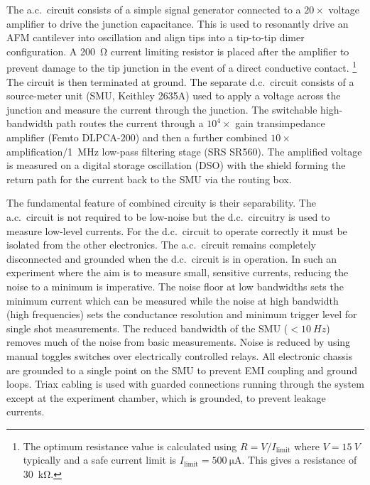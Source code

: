 \documentclass{article}
\begin{document}
The a.c.\ circuit consists of a simple signal generator connected to a $20\times$ voltage amplifier to drive the junction capacitance. This is used to resonantly drive an AFM cantilever into oscillation and align tips into a tip-to-tip dimer configuration. A \SI{200}{\ohm} current limiting resistor is placed after the amplifier to prevent damage to the tip junction in the event of a direct conductive contact.%
\footnote{The optimum resistance value is calculated using $R = V/I_{\mathrm{limit}}$ where $V=\SI{15}{V}$ typically and a safe current limit is $I_{\mathrm{limit}}=\SI{500}{\micro\ampere}$. This gives a resistance of \SI{30}{\kilo\ohm}.}
The circuit is then terminated at ground.
The separate d.c.\ circuit consists of a source-meter unit (SMU, Keithley 2635A) used to apply a voltage across the junction and measure the current through the junction. The switchable high-bandwidth path routes the current through a $10^4\times$ gain transimpedance amplifier (Femto DLPCA-200) and then a further combined $10\times$ amplification/\SI{1}{MHz} low-pass filtering stage (SRS SR560). The amplified voltage is measured on a digital storage oscillation (DSO) with the shield forming the return path for the current back to the SMU via the routing box.

The fundamental feature of combined circuity is their separability. The a.c.\ circuit is not required to be low-noise but the d.c.\ circuitry is used to measure low-level currents. For the d.c.\ circuit to operate correctly it must be isolated from the other electronics. The a.c.\ circuit remains completely disconnected {\color{red} and grounded} when the d.c.\ circuit is in operation.
In such an experiment where the aim is to measure small, sensitive currents, reducing the noise to a minimum is imperative. The noise floor at low bandwidths sets the minimum current which can be measured while the noise at high bandwidth (high frequencies) sets the conductance resolution and minimum trigger level for single shot measurements.
The reduced bandwidth of the SMU ($<\SI{10}{Hz}$) removes much of the noise from {\color{red}basic} measurements. Noise is reduced by using manual toggles switches over electrically controlled relays. All electronic chassis are grounded to a single point on the SMU to prevent EMI coupling and ground loops. Triax cabling is used with guarded connections running through the system except at the experiment chamber, which is grounded, to prevent leakage currents.
\end{document}
